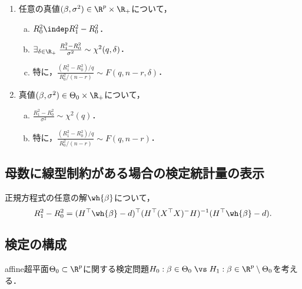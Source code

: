 \documentclass[uplatex,dvipdfmx]{jsreport}
\begin{document}
\begin{theorem}\mbox{}\label{thm-F-test-for-Gauss-Markov-model}
    \begin{enumerate}
        \item 任意の真値$(\beta,\sigma^2)\in\R^p\times\R_+$について，
        \begin{enumerate}[(a)]
            \item $R_0^2\indep R^2_1-R^2_0$．
            \item $\exists_{\delta\in\R_+}\;\frac{R^2_1-R^2_0}{\sigma^2}\sim\chi^2(q,\delta)$．
            \item 特に，$\frac{(R^2_1-R^2_0)/q}{R^2_0/(n-r)}\sim F(q,n-r,\delta)$．
        \end{enumerate}
        \item 真値$(\beta,\sigma^2)\in\Theta_0\times\R_+$について，
        \begin{enumerate}[(a)]
            \item $\frac{R^2_1-R^2_0}{\sigma^2}\sim\chi^2(q)$．
            \item 特に，$\frac{(R^2_1-R^2_0)/q}{R^2_0/(n-r)}\sim F(q,n-r)$．
        \end{enumerate}
    \end{enumerate}
\end{theorem}

\subsection{母数に線型制約がある場合の検定統計量の表示}

\begin{proposition}
    正規方程式の任意の解$\wh{\beta}$について，
    \[R^2_1-R^2_0=(H^\top\wh{\beta}-d)^\top(H^\top(X^\top X)^-H)^{-1}(H^\top\wh{\beta}-d).\]
\end{proposition}

\subsection{検定の構成}

\begin{problem}[平均ベクトルのaffine集合への所属の決定問題]
    affine超平面$\Theta_0\subset\R^p$に関する検定問題$H_0:\beta\in\Theta_0\;\vs\; H_1:\beta\in\R^p\setminus\Theta_0$を考える．
\end{problem}
\end{document}
